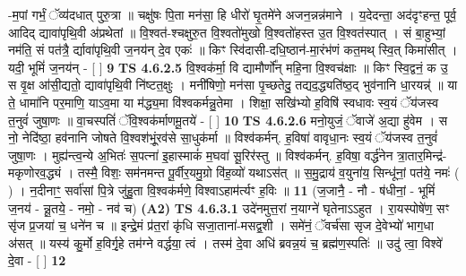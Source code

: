 \documentclass[17pt]{extarticle}
\begin{document}
                  -म॒पां गर्भं॒ ॅव्य॑दधात् पुरु॒त्रा ॥ चक्षु॑षः पि॒ता मन॑सा॒ हि धीरो॑ घृ॒तमे॑ने अजन॒न्नन्न॑माने । य॒देदन्ता॒ अद॑दृꣳहन्त॒ पूर्व॒ आदिद् द्यावा॑पृथि॒वी अ॑प्रथेतां ॥ वि॒श्वत॑-श्चक्षुरु॒त वि॒श्वतो॑मुखो वि॒श्वतो॑हस्त उ॒त वि॒श्वत॑स्पात् । सं बा॒हुभ्यां॒ नम॑ति॒ सं पत॑त्रै॒ र्द्यावा॑पृथि॒वी ज॒नय॑न् दे॒व एकः॑ ॥ किꣳ स्वि॑दासी-दधि॒ष्ठान॑-मा॒रंभ॑णं कत॒मथ् स्वि॒त् किमा॑सीत् । यदी॒ भूमिं॑ ज॒नय॑न् - [  ] \textbf{  9} \newline
                  \newline
                                \textbf{ TS 4.6.2.5} \newline
                  वि॒श्वक॑र्मा॒ वि द्यामौर्णो᳚न् महि॒ना वि॒श्वच॑क्षाः ॥ किꣳ स्वि॒द्वनं॒ क उ॒ स वृ॒क्ष आ॑सी॒द्यतो॒ द्यावा॑पृथि॒वी नि॑ष्टत॒क्षुः । मनी॑षिणो॒ मन॑सा पृ॒च्छतेदु॒ तद्यद॒द्ध्यति॑ष्ठ॒द् भुव॑नानि धा॒रयन्न्॑ ॥ या ते॒ धामा॑नि पर॒माणि॒ याऽव॒मा या म॑द्ध्य॒मा वि॑श्वकर्मन्नु॒तेमा । शिक्षा॒ सखि॑भ्यो ह॒विषि॑ स्वधावः स्व॒यं ॅय॑जस्व त॒नुवं॑ जुषा॒णः ॥ वा॒चस्पतिं॑ ॅवि॒श्वक॑र्माणमू॒तये॑ - [  ] \textbf{  10} \newline
                  \newline
                                \textbf{ TS 4.6.2.6} \newline
                  मनो॒युजं॒ ॅवाजे॑ अ॒द्या हु॑वेम । स नो॒ नेदि॑ष्ठा॒ हव॑नानि जोषते वि॒श्वश॑भूं॒रव॑से सा॒धुक॑र्मा ॥ विश्व॑कर्मन्. ह॒विषा॑ वावृधा॒नः स्व॒यं ॅय॑जस्व त॒नुवं॑ जुषा॒णः । मुह्य॑न्त्व॒न्ये अ॒भितः॑ स॒पत्ना॑ इ॒हास्माकं॑ म॒घवा॑ सू॒रिर॑स्तु ॥ विश्व॑कर्मन्. ह॒विषा॒ वर्द्ध॑नेन त्रा॒तार॒मिन्द्र॑-मकृणोरव॒द्ध्यं । तस्मै॒ विशः॒ सम॑नमन्त पू॒र्वीर॒यमु॒ग्रो वि॑ह॒व्यो॑ यथाऽस॑त् ॥ स॒मु॒द्राय॑ व॒युना॑य॒ सिन्धू॑नां॒ पत॑ये॒ नमः॑ ( ) । न॒दीनाꣳ॒॒ सर्वा॑सां पि॒त्रे जु॑हु॒ता वि॒श्वक॑र्मणे॒ विश्वाऽहाम॑र्त्यꣳ ह॒विः ॥ \textbf{  11} \newline
                  \newline
                      (ज॒जानै॒ - नौ - ष॑धीनां॒ - भूमिं॑ ज॒नय॑ - न्नू॒तये॒ - नमो॒ - नव॑ च)  \textbf{(A2)} \newline \newline
                                        \textbf{ TS 4.6.3.1} \newline
                  उदे॑नमुत्त॒रां न॒याग्ने॑ घृतेनाऽऽहुत । रा॒यस्पोषे॑ण॒ सꣳ सृ॑ज प्र॒जया॑ च॒ धने॑न च ॥ इन्द्रे॒मं प्र॑त॒रां कृ॑धि सजा॒ताना॑-मसद्व॒शी । समे॑नं॒ ॅवर्च॑सा सृज दे॒वेभ्यो॑ भाग॒धा अ॑सत् ॥ यस्य॑ कु॒र्मो ह॒विर्गृ॒हे तम॑ग्ने वर्द्धया॒ त्वं । तस्म॑ दे॒वा अधि॑ ब्रवन्न॒यं च॒ ब्रह्म॑ण॒स्पतिः॑ ॥ उदु॑ त्वा॒ विश्वे॑ दे॒वा - [  ] \textbf{  12} \newline
\end{document}
